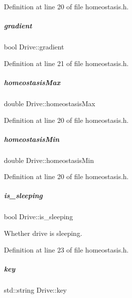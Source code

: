Definition at line 20 of file homeostasis.\+h.

\mbox{\label{group__homeostasis_a634b05e0fce5a0860365521cd4a6d1ac}} 
\subparagraph{\texorpdfstring{gradient}{gradient}}
{\footnotesize\ttfamily bool Drive\+::gradient}



Definition at line 21 of file homeostasis.\+h.

\mbox{\label{group__homeostasis_aeb14a32eaee7ef9db95132656378c4c9}} 
\subparagraph{\texorpdfstring{homeostasis\+Max}{homeostasisMax}}
{\footnotesize\ttfamily double Drive\+::homeostasis\+Max}



Definition at line 20 of file homeostasis.\+h.

\mbox{\label{group__homeostasis_a631e678038c0758143956be67f13e869}} 
\subparagraph{\texorpdfstring{homeostasis\+Min}{homeostasisMin}}
{\footnotesize\ttfamily double Drive\+::homeostasis\+Min}



Definition at line 20 of file homeostasis.\+h.

\mbox{\label{group__homeostasis_ab0c97482a89f335c3ed23f3b7ea97551}} 
\subparagraph{\texorpdfstring{is\+\_\+sleeping}{is\_sleeping}}
{\footnotesize\ttfamily bool Drive\+::is\+\_\+sleeping}



Whether drive is sleeping. 



Definition at line 23 of file homeostasis.\+h.

\mbox{\label{group__homeostasis_a4db43d91ee5e904568449ca7ae5eb032}} 
\subparagraph{\texorpdfstring{key}{key}}
{\footnotesize\ttfamily std\+::string Drive\+::key}



